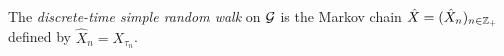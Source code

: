 The \emph{discrete-time simple random walk} on $\mathcal{G}$ is the Markov chain
$\hat X = (\hat X_n)_{n\in{\mathbb Z}_+}$ defined by $\hat X_n = X_{\tau_n}$.




